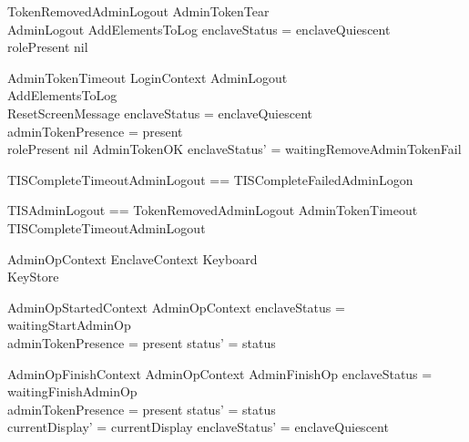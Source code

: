 \begin{schema}{TokenRemovedAdminLogout}
        AdminTokenTear
\\      AdminLogout
\also
        AddElementsToLog
\where
        enclaveStatus = enclaveQuiescent 
\\      rolePresent \neq nil
\end{schema}

\begin{schema}{AdminTokenTimeout}
        LoginContext
\also
        AdminLogout
\\      AddElementsToLog
\\      ResetScreenMessage
\where
        enclaveStatus = enclaveQuiescent 
\\      adminTokenPresence = present
\\      rolePresent \neq nil
\also
        \lnot AdminTokenOK
\also
        enclaveStatus' = waitingRemoveAdminTokenFail
\end{schema}

\begin{zed}
TISCompleteTimeoutAdminLogout == TISCompleteFailedAdminLogon
\end{zed}

\begin{zed}
TISAdminLogout ==  TokenRemovedAdminLogout \lor AdminTokenTimeout \lor TISCompleteTimeoutAdminLogout 
\end{zed}

\begin{schema}{AdminOpContext}
        EnclaveContext
\also
        \Xi Keyboard
\\      \Xi KeyStore
\end{schema}

\begin{schema}{AdminOpStartedContext}
        AdminOpContext
\where
        enclaveStatus = waitingStartAdminOp
\\      adminTokenPresence = present
\also
        status' = status
\end{schema}

\begin{schema}{AdminOpFinishContext}
        AdminOpContext
\also
        AdminFinishOp
\where
        enclaveStatus = waitingFinishAdminOp
\\      adminTokenPresence = present
\also
        status' = status
\\      currentDisplay' = currentDisplay
\also
        enclaveStatus' = enclaveQuiescent
\end{schema}


